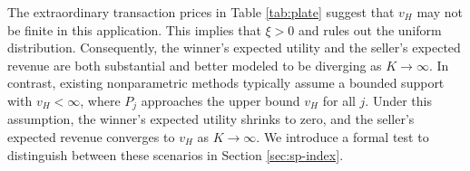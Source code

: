 \begin{runningexamplecont}
The extraordinary transaction prices in Table \ref{tab:plate} suggest that $v_H$ may not be finite in this application. This implies that $\xi > 0$ and rules out the uniform distribution. Consequently, the winner's expected utility and the seller's expected revenue are both substantial and better modeled to be diverging as $K \to \infty$. In contrast, existing nonparametric methods typically assume a bounded support with $v_H < \infty$, where $P_j$ approaches the upper bound $v_H$ for all $j$. Under this assumption, the winner's expected utility shrinks to zero, and the seller's expected revenue converges to $v_H$ as $K \to \infty$. We introduce a formal test to distinguish between these scenarios in Section \ref{sec:sp-index}. 
\end{runningexamplecont}


